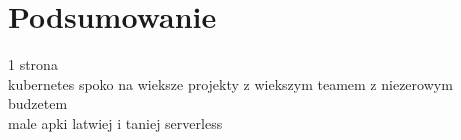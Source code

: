 \chapter{Podsumowanie}
\label{cha:summary}

1 strona\\
kubernetes spoko na wieksze projekty z wiekszym teamem z niezerowym budzetem\\
male apki latwiej i taniej serverless